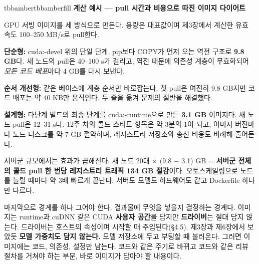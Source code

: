 \begin{calloutbox}{tbbamber}{tbbamberfill}
{\normalsize\bfseries\color{tbbamberdark}계산 예시 — pull 시간과 비용으로 따진 이미지 다이어트}\par\vspace{3pt}
GPU 서빙 이미지를 세 방식으로 만든다. 용량은 대표값이며 제3장에서 계산한 유효 속도 100–250 MB/s로 pull한다.

\begin{tbbitemize}
  \item \textbf{단순형:} cuda:-devel 위의 단일 단계, pip보다 COPY가 먼저 오는 역전 구조로 \textbf{9.8 GB}다. 새 노드의 pull은 40–100 s가 걸리고, 역전 때문에 의존성 계층이 무효화되어 \textit{모든 코드 배포}마다 4 GB를 다시 보낸다.
  \item \textbf{순서 개선형:} 같은 베이스에 계층 순서만 바로잡는다. 첫 pull은 여전히 9.8 GB지만 코드 배포는 약 40 KB만 움직인다. 두 줄을 옮겨 문제의 절반을 해결했다.
  \item \textbf{설계형:} 다단계 빌드의 최종 단계를 cuda:-runtime으로 만든 \textbf{3.1 GB} 이미지다. 새 노드 pull은 12–31 s다. 12주 차의 콜드 스타트 항목은 약 3분의 1이 되고, 이미지 버전마다 노드 디스크를 약 7 GB 절약하며, 레지스트리 저장소와 송신 비용도 비례해 줄어든다.
\end{tbbitemize}

서버군 규모에서는 효과가 곱해진다. 새 노드 20대 × (9.8 − 3.1) GB = \textbf{서버군 전체의 콜드 pull 한 번당 레지스트리 트래픽 134 GB 절감}이다. 오토스케일링으로 노드를 늘릴 때마다 약 3배 빠르게 끝난다. 서버도 모델도 하드웨어도 같고 Dockerfile 하나만 다르다.
\end{calloutbox}

\vspace{3.0pt}

마지막으로 경계를 하나 그어야 한다. 결과물에 무엇을 넣을지 결정하는 경계다. 이미지는 runtime과 cuDNN 같은 CUDA \textbf{사용자 공간}을 담지만 \textbf{드라이버}는 절대 담지 않는다. 드라이버는 호스트의 속성이며 시작할 때 주입된다(§4.5). 제3장과 제6장에서 보았듯 \textbf{모델 가중치도 담지 않는다.} 모델 저장소에 두고 부팅할 때 불러온다. 그러면 이미지에는 코드, 의존성, 설정만 남는다. 코드와 같은 주기로 바뀌고 코드와 같은 리뷰 절차를 거쳐야 하는 부분, 바로 이미지가 담아야 할 내용이다.

